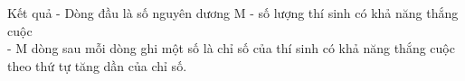 Kết quả
- Dòng đầu là số nguyên dương M - số lượng thí sinh có khả năng thắng cuộc   
\\   - M dòng sau mỗi dòng ghi một số là chỉ số của thí sinh có khả năng thắng cuộc theo thứ tự tăng dần của chỉ số.